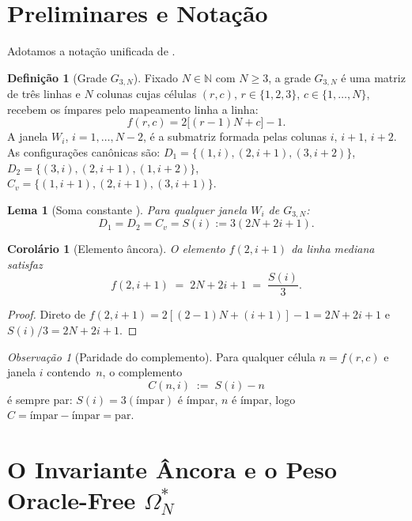 \documentclass[12pt,a4paper]{article}
\newtheorem{lemma}[theorem]{Lema}
\newtheorem{corollary}[theorem]{Corolário}
\theoremstyle{definition}
\newtheorem{definition}[theorem]{Definição}
\theoremstyle{remark}
\newtheorem{remark}[theorem]{Observação}
\newcommand{\NN}{\mathbb{N}}
\newcommand{\Grid}{G_{3,N}}
\newcommand{\Oms}{\Omega^*_N}        %
\begin{document}
	\section{Preliminares e Notação}
	
	Adotamos a notação unificada de \cite{bandeira2026unif}.
	
	\begin{definition}[Grade $G_{3,N}$]
		Fixado $N\in\NN$ com $N\geq3$, a grade $\Grid$ é uma matriz de três linhas e
		$N$ colunas cujas células $(r,c)$, $r\in\{1,2,3\}$, $c\in\{1,\dots,N\}$,
		recebem os ímpares pelo mapeamento linha a linha:
		\[
		f(r,c) = 2\bigl[(r-1)N+c\bigr]-1.
		\]
		A janela $W_i$, $i=1,\dots,N-2$, é a submatriz formada pelas colunas
		$i,\,i{+}1,\,i{+}2$.
		As configurações canônicas são: $D_1 = \{(1,i),(2,i{+}1),(3,i{+}2)\}$,
		$D_2 = \{(3,i),(2,i{+}1),(1,i{+}2)\}$, $C_v = \{(1,i{+}1),(2,i{+}1),(3,i{+}1)\}$.
	\end{definition}
	
	\begin{lemma}[Soma constante {\cite[Lema~1]{bandeira2026soma}}]
		\label{lem:soma}
		Para qualquer janela $W_i$ de $\Grid$:
		\[
		D_1 = D_2 = C_v = S(i) := 3(2N+2i+1).
		\]
	\end{lemma}
	
	\begin{corollary}[Elemento âncora]
		\label{cor:ancora}
		O elemento $f(2,i{+}1)$ da linha mediana satisfaz
		\[
		f(2,i{+}1) \;=\; 2N+2i+1 \;=\; \frac{S(i)}{3}.
		\]
	\end{corollary}
	
	\begin{proof}
		Direto de $f(2,i{+}1)=2[(2-1)N+(i{+}1)]-1=2N+2i+1$ e $S(i)/3=2N+2i+1$.
	\end{proof}
	
	\begin{remark}[Paridade do complemento]
		\label{rem:paridade}
		Para qualquer célula $n=f(r,c)$ e janela $i$ contendo~$n$, o complemento
		\[
		C(n,i) \;:=\; S(i)-n
		\]
		é sempre par: $S(i)=3(\text{ímpar})$ é ímpar, $n$ é ímpar,
		logo $C=\text{ímpar}-\text{ímpar}=\text{par}$.
	\end{remark}
	
	\section{O Invariante Âncora e o Peso Oracle-Free $\Oms$}
	
\end{document}

